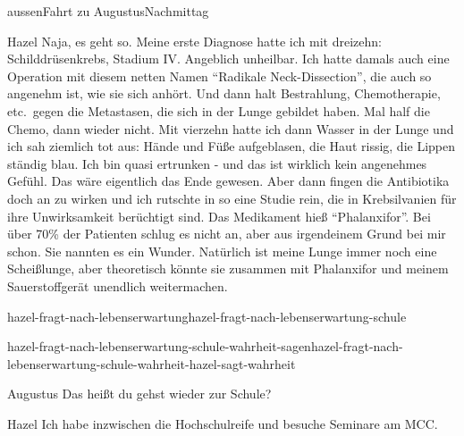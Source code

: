 \documentclass[12pt]{article}
\begin{document}
\begin{scene}{aussen}{Fahrt zu Augustus}{Nachmittag}
        \begin{dialog}{Hazel}
            Naja, es geht so.
            Meine erste Diagnose hatte ich mit dreizehn: Schilddrüsenkrebs, Stadium IV\@.
            Angeblich unheilbar.
            Ich hatte damals auch eine Operation mit diesem netten Namen ``Radikale Neck-Dissection'', die auch so angenehm ist, wie sie sich anhört.
            Und dann halt Bestrahlung, Chemotherapie, etc.~gegen die Metastasen, die sich in der Lunge gebildet haben.
            Mal half die Chemo, dann wieder nicht.
            Mit vierzehn hatte ich dann Wasser in der Lunge und ich sah ziemlich tot aus:
            Hände und Füße aufgeblasen, die Haut rissig, die Lippen ständig blau.
            Ich bin quasi ertrunken - und das ist wirklich kein angenehmes Gefühl.
            Das wäre eigentlich das Ende gewesen.
            Aber dann fingen die Antibiotika doch an zu wirken und ich rutschte in so eine Studie rein, die in Krebsilvanien für ihre Unwirksamkeit berüchtigt sind.
            Das Medikament hieß ``Phalanxifor''.
            Bei über 70\% der Patienten schlug es nicht an, aber aus irgendeinem Grund bei mir schon.
            Sie nannten es ein Wunder.
            Natürlich ist meine Lunge immer noch eine Scheißlunge, aber theoretisch könnte sie zusammen mit Phalanxifor und meinem Sauerstoffgerät unendlich weitermachen.
        \end{dialog}

        \begin{conditional}{hazel-fragt-nach-lebenserwartung}{hazel-fragt-nach-lebenserwartung-schule}
            \begin{conditional}{hazel-fragt-nach-lebenserwartung-schule-wahrheit-sagen}{hazel-fragt-nach-lebenserwartung-schule-wahrheit-hazel-sagt-wahrheit}
                \begin{dialog}{Augustus}
                    Das heißt du gehst wieder zur Schule?
                \end{dialog}

                \begin{dialog}{Hazel}
                    Ich habe inzwischen die Hochschulreife und besuche Seminare am MCC.
                \end{dialog}


\end{conditional}
\end{conditional}
\end{scene}
\end{document}
